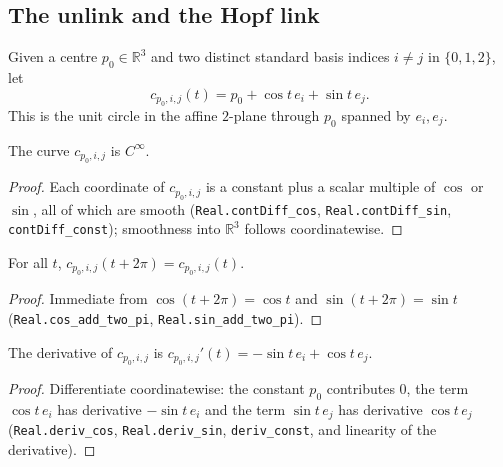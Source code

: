 \subsection{The unlink and the Hopf link}

\begin{definition}
    \label{def:coordinate-circle}
    Given a centre $p_0\in\mathbb{R}^3$ and two distinct standard basis indices
    $i\neq j$ in $\{0,1,2\}$, let
    \[
        c_{p_0,i,j}(t) = p_0 + \cos t\, e_i + \sin t\, e_j .
    \]
    This is the unit circle in the affine $2$-plane through $p_0$ spanned by
    $e_i, e_j$.
\end{definition}

\begin{lemma}
    \label{lem:cc-smooth}
    \leanok
    The curve $c_{p_0,i,j}$ is $C^\infty$.
\end{lemma}
\begin{proof}
    Each coordinate of $c_{p_0,i,j}$ is a constant plus a scalar multiple of
    $\cos$ or $\sin$, all of which are smooth (\texttt{Real.contDiff\_cos},
    \texttt{Real.contDiff\_sin}, \texttt{contDiff\_const}); smoothness into
    $\mathbb{R}^3$ follows coordinatewise.
\end{proof}

\begin{lemma}
    \label{lem:cc-periodic}
    For all $t$, $c_{p_0,i,j}(t + 2\pi) = c_{p_0,i,j}(t)$.
\end{lemma}
\begin{proof}
    Immediate from $\cos(t+2\pi) = \cos t$ and $\sin(t+2\pi) = \sin t$
    (\texttt{Real.cos\_add\_two\_pi}, \texttt{Real.sin\_add\_two\_pi}).
\end{proof}

\begin{lemma}
    \label{lem:cc-deriv}
    \leanok
    The derivative of $c_{p_0,i,j}$ is
    $c_{p_0,i,j}'(t) = -\sin t\, e_i + \cos t\, e_j$.
\end{lemma}
\begin{proof}
    Differentiate coordinatewise: the constant $p_0$ contributes $0$, the term
    $\cos t\, e_i$ has derivative $-\sin t\, e_i$ and the term $\sin t\, e_j$ has
    derivative $\cos t\, e_j$ (\texttt{Real.deriv\_cos}, \texttt{Real.deriv\_sin},
    \texttt{deriv\_const}, and linearity of the derivative).
\end{proof}

